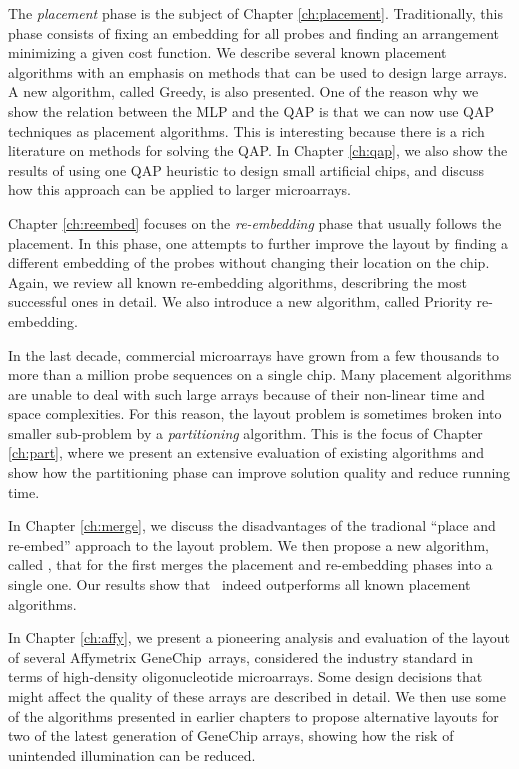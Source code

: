 The \emph{placement} phase is the subject of Chapter \ref{ch:placement}.
Traditionally, this phase consists of fixing an embedding for all probes and
finding an arrangement minimizing a given cost function. We describe several
known placement algorithms with an emphasis on methods that can be used to
design large arrays. A new algorithm, called Greedy, is also presented. One of
the reason why we show the relation between the MLP and the QAP is that we can
now use QAP techniques as placement algorithms. This is interesting because
there is a rich literature on methods for solving the QAP. In Chapter
\ref{ch:qap}, we also show the results of using one QAP heuristic to design
small artificial chips, and discuss how this approach can be applied to larger
microarrays.

Chapter \ref{ch:reembed} focuses on the \emph{re-embedding} phase that usually
follows the placement. In this phase, one attempts to further improve the layout
by finding a different embedding of the probes without changing their location
on the chip. Again, we review all known re-embedding algorithms, describring the
most successful ones in detail. We also introduce a new algorithm, called
Priority re-embedding.

In the last decade, commercial microarrays have grown from a few thousands to
more than a million probe sequences on a single chip. Many placement algorithms
are unable to deal with such large arrays because of their non-linear time and
space complexities. For this reason, the layout problem is sometimes broken into
smaller sub-problem by a \emph{partitioning} algorithm. This is the focus of
Chapter \ref{ch:part}, where we present an extensive evaluation of existing
algorithms and show how the partitioning phase can improve solution quality and
reduce running time.

In Chapter \ref{ch:merge}, we discuss the disadvantages of the tradional ``place
and re-embed'' approach to the layout problem. We then propose a new algorithm,
called \Greedyplus, that for the first merges the placement and re-embedding
phases into a single one. Our results show that \Greedyplus\ indeed outperforms
all known placement algorithms.

In Chapter \ref{ch:affy}, we present a pioneering analysis and evaluation of the
layout of several Affymetrix GeneChip\textR\ arrays, considered the industry
standard in terms of high-density oligonucleotide microarrays. Some design
decisions that might affect the quality of these arrays are described in detail.
We then use some of the algorithms presented in earlier chapters to propose
alternative layouts for two of the latest generation of GeneChip arrays, showing
how the risk of unintended illumination can be reduced.

